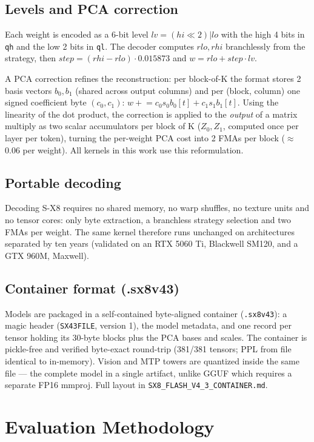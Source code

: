 \documentclass[11pt]{article}
\begin{document}
\subsection{Levels and PCA correction}
Each weight is encoded as a 6-bit level $\mathit{lv} = (\mathit{hi} \ll 2) | \mathit{lo}$ with the high 4
bits in \texttt{qh} and the low 2 bits in \texttt{ql}. The decoder computes $\mathit{rlo}, \mathit{rhi}$
branchlessly from the strategy, then $\mathit{step} = (\mathit{rhi}-\mathit{rlo})\cdot 0.015873$ and
$w = \mathit{rlo} + \mathit{step}\cdot \mathit{lv}$.

A PCA correction refines the reconstruction: per block-of-K the format stores 2 basis vectors
$b_0, b_1$ (shared across output columns) and per (block, column) one signed coefficient byte
$(c_0, c_1)$: $w \mathrel{+}= c_0 s_0 b_0[t] + c_1 s_1 b_1[t]$. Using the linearity of the dot product,
the correction is applied to the \emph{output} of a matrix multiply as two scalar accumulators per block
of K ($Z_0, Z_1$, computed once per layer per token), turning the per-weight PCA cost into 2 FMAs per
block ($\approx$0.06 per weight). All kernels in this work use this reformulation.

\subsection{Portable decoding}
Decoding S-X8 requires no shared memory, no warp shuffles, no texture units and no tensor cores: only byte
extraction, a branchless strategy selection and two FMAs per weight. The same kernel therefore runs
unchanged on architectures separated by ten years (validated on an RTX 5060 Ti, Blackwell SM120, and a
GTX 960M, Maxwell).

\subsection{Container format (.sx8v43)}
Models are packaged in a self-contained byte-aligned container (\texttt{.sx8v43}): a magic header
(\texttt{SX43FILE}, version 1), the model metadata, and one record per tensor holding its 30-byte blocks
plus the PCA bases and scales. The container is pickle-free and verified byte-exact round-trip (381/381
tensors; PPL from file identical to in-memory). Vision and MTP towers are quantized inside the same file
--- the complete model in a single artifact, unlike GGUF which requires a separate FP16 mmproj. Full
layout in \texttt{SX8\_FLASH\_V4\_3\_CONTAINER.md}.

\section{Evaluation Methodology}
\end{document}
